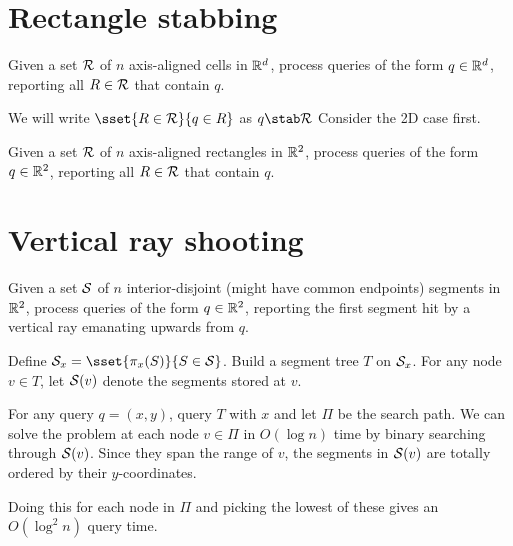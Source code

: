 \section{Rectangle stabbing} \label{sec:stab}

\begin{question*}
    Given a set $\mathcal{R}$ of $n$ axis-aligned cells in $\mathbb{R}^d$, process
    queries of the form $q \in \mathbb{R}^d$, reporting all $R \in \mathcal{R}$ that
    contain $q$.
\end{question*}
We will write $\sset{R \in \mcR}{q \in R}$ as $q \stab \mcR$
Consider the 2D case first.
\begin{question*}
    Given a set $\mathcal{R}$ of $n$ axis-aligned rectangles in $\mathbb{R}^2$, process
    queries of the form $q \in \mathbb{R}^2$, reporting all $R \in \mathcal{R}$ that
    contain $q$.
\end{question*}
\begin{solution}
    
\end{solution}

\section{Vertical ray shooting} \label{sec:vrs}
\begin{question*}
    Given a set $\mathcal{S}$ of $n$ interior-disjoint (might have common
    endpoints) segments in $\mathbb{R}^2$, process queries of the form
    $q \in \mathbb{R}^2$, reporting the first segment hit by a vertical ray
    emanating upwards from $q$.
\end{question*}
\begin{solution}
    Define $\mcS_x = \sset{\pi_x(S)}{S \in \mcS}$.
    Build a segment tree $T$ on $\mathcal{S}_x$.
    For any node $v \in T$, let $\mathcal{S}(v)$ denote the segments stored at $v$.

    For any query $q = (x, y)$, query $T$ with $x$ and let $\Pi$ be the
    search path.
    We can solve the problem at each node $v \in \Pi$ in $O(\log n)$ time
    by binary searching through $\mathcal{S}(v)$.
    Since they span the range of $v$, the segments in $\mathcal{S}(v)$ are totally
    ordered by their $y$-coordinates.

    Doing this for each node in $\Pi$ and picking the lowest of these gives
    an $O(\log^2 n)$ query time.
\end{solution}

